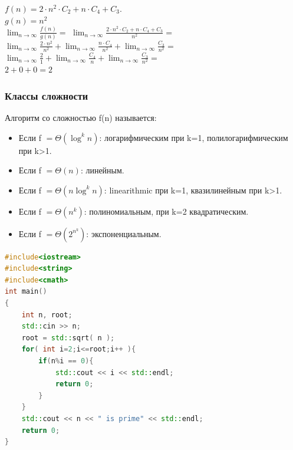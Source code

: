 \documentclass[russian, 12pt]{beamer}
\begin{document}
\begin{frame}
  $f(n) = 2\cdot n^2 \cdot C_2 + n \cdot C_4 + C_3.$\\[0.1cm]
  $g(n) = n^2$\\[0.2cm]
  $\lim_{n\rightarrow\infty}\frac{f(n)}{g(n)} =$\pause
  $\lim_{n\rightarrow\infty}\frac{2\cdot n^2 \cdot C_2 + 
  n \cdot C_4 + C_3}{n^2}=$\\[0.3cm]\pause
  $\lim_{n\rightarrow\infty}\frac{2\cdot n^2}{n^2}+
  \lim_{n\rightarrow\infty}\frac{n \cdot C_4}{n^2}+
  \lim_{n\rightarrow\infty}\frac{C_3}{n^2}=$\\[0.3cm]\pause
  $\lim_{n\rightarrow\infty}\frac{2}{1}+
  \lim_{n\rightarrow\infty}\frac{C_4}{n}+
  \lim_{n\rightarrow\infty}\frac{C_3}{n^2}=$\\[0.3cm]\pause
  $2 + 0 + 0 = 2$
\end{frame}
\begin{frame}
\frametitle{Классы сложности}
Алгоритм со сложностью f(n) называется:
\begin{itemize}
  \item Если f $=\Theta(\log^kn)$: 
  логарифмическим при k=1, полилогарифмическим при k>1.\\[0.3cm]

  \item Если f $=\Theta(n)$: 
  линейным.\\[0.3cm]

  \item Если f $=\Theta(n\log^kn)$: 
  linearithmic при k=1, квазилинейным при k>1.\\[0.3cm]
  
  \item Если f $=\Theta(n^k)$: 
  полиномиальным, при k=2 квадратическим. \\[0.3cm]
  
  \item Если f $=\Theta(2^{n^k})$: 
  экспоненциальным. \\

\end{itemize}
\end{frame}
\lstset{style=mystyle}
\begin{frame}[fragile]
%
\begin{lstlisting}[language=C++]
#include<iostream> 
#include<string>
#include<cmath>
int main()
{
    int n, root;
    std::cin >> n;
    root = std::sqrt( n );
    for( int i=2;i<=root;i++ ){
        if(n%i == 0){
            std::cout << i << std::endl;
            return 0;
        }
    }
    std::cout << n << " is prime" << std::endl;
    return 0;
}  
\end{lstlisting}
\end{frame}
\end{document}
